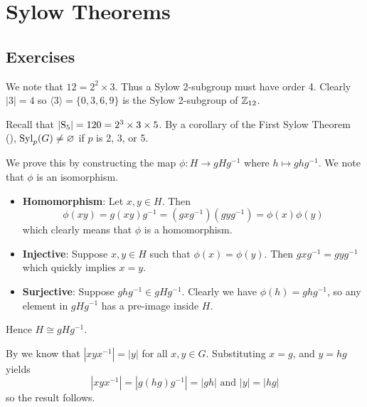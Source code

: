\section{Sylow Theorems}
\subsection*{Exercises}
\begin{questions}
    \item We note that $12 = 2^2 \times 3$. Thus a Sylow 2-subgroup must have order 4. Clearly $|3| = 4$ so $\langle 3 \rangle = \{0, 3, 6, 9\}$ is the Sylow 2-subgroup of $\mathbb{Z}_{12}$.

    \item Recall that $|\mathrm{S}_{5}| = 120 = 2^3 \times 3 \times 5$. By a corollary of the First Sylow Theorem (), $\mathrm{Syl}_{p}(G) \neq \varnothing$ if $p$ is 2, 3, or 5.

    \item We prove this by constructing the map $\phi: H \to gHg^{-1}$ where $h \mapsto ghg^{-1}$. We note that $\phi$ is an isomorphism.
    \begin{itemize}
        \item \textbf{Homomorphism}: Let $x, y \in H$. Then
        \[
            \phi(xy) = g(xy)g^{-1} = (gxg^{-1})(gyg^{-1}) = \phi(x)\phi(y)
        \]
        which clearly means that $\phi$ is a homomorphism.

        \item \textbf{Injective}: Suppose $x, y \in H$ such that $\phi(x) = \phi(y)$. Then $gxg^{-1} = gyg^{-1}$ which quickly implies $x = y$.

        \item \textbf{Surjective}: Suppose $ghg^{-1} \in gHg^{-1}$. Clearly we have $\phi(h) = ghg^{-1}$, so any element in $gHg^{-1}$ has a pre-image inside $H$.
    \end{itemize}
    Hence $H \cong gHg^{-1}$.

    \item By  we know that $|xyx^{-1}| = |y|$ for all $x, y \in G$. Substituting $x = g$, and $y = hg$ yields
    \[
        |xyx^{-1}| = |g(hg)g^{-1}| = |gh| \text{ and } |y| = |hg|
    \]
    so the result follows.


\end{questions}

